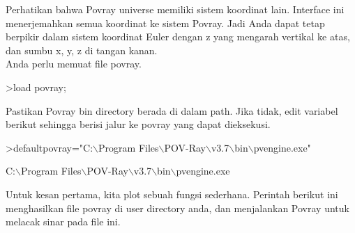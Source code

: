 \documentclass[a4paper,10pt]{article}
\begin{document}
\begin{eulernotebook}
\begin{eulercomment}
Perhatikan bahwa Povray universe memiliki sistem koordinat lain.
Interface ini menerjemahkan semua koordinat ke sistem Povray. Jadi
Anda dapat tetap berpikir dalam sistem koordinat Euler dengan z yang
mengarah vertikal ke atas, dan sumbu x, y, z di tangan kanan.\\
Anda perlu memuat file povray.
\end{eulercomment}
\begin{eulerprompt}
>load povray;
\end{eulerprompt}
\begin{eulercomment}
Pastikan Povray bin directory berada di dalam path. Jika tidak, edit
variabel berikut sehingga berisi jalur ke povray yang dapat
dieksekusi.
\end{eulercomment}
\begin{eulerprompt}
>defaultpovray="C:\(\backslash\)Program Files\(\backslash\)POV-Ray\(\backslash\)v3.7\(\backslash\)bin\(\backslash\)pvengine.exe"
\end{eulerprompt}
\begin{euleroutput}
  C:\(\backslash\)Program Files\(\backslash\)POV-Ray\(\backslash\)v3.7\(\backslash\)bin\(\backslash\)pvengine.exe
\end{euleroutput}
\begin{eulercomment}
Untuk kesan pertama, kita plot sebuah fungsi sederhana. Perintah
berikut ini menghasilkan file povray di user directory anda, dan
menjalankan Povray untuk melacak sinar pada file ini.


\end{eulercomment}
\end{eulernotebook}
\end{document}
